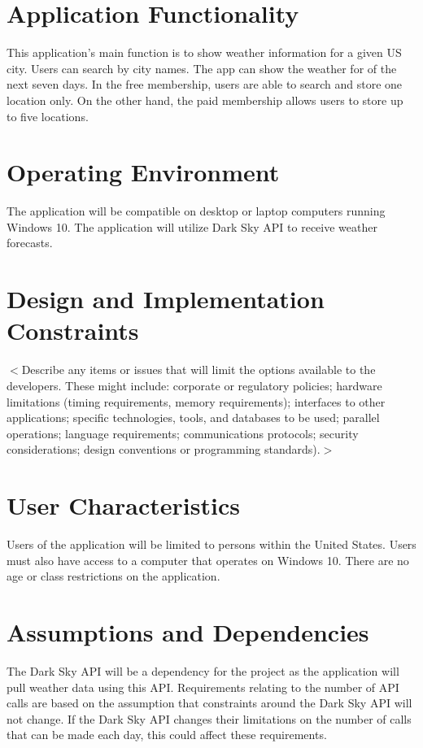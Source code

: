 \documentclass{scrreprt}
\begin{document}
\section{Application Functionality}
This application's main function is to show weather information for a given US city. Users can search by city names. The app can show the weather for of the next seven days. In the free membership, users are able to search and store one location only. On the other hand, the paid membership allows users to store up to five locations. 	

\section{Operating Environment}
The application will be compatible on desktop or laptop computers running Windows 10. The application will utilize Dark Sky API to receive weather forecasts.	

\section{Design and Implementation Constraints}
$<$Describe any items or issues that will limit the options available to the 
developers. These might include: corporate or regulatory policies; hardware 
limitations (timing requirements, memory requirements); interfaces to other 
applications; specific technologies, tools, and databases to be used; parallel 
operations; language requirements; communications protocols; security 
considerations; design conventions or programming standards).$>$

\section{User Characteristics}
Users of the application will be limited to persons within the United States. Users must also have access to a computer that operates on Windows 10. There are no age or class restrictions on the application.
					
\section{Assumptions and Dependencies}
The Dark Sky API will be a dependency for the project as the application will pull weather data using this API. Requirements relating to the number of API calls are based on the assumption that constraints around the Dark Sky API will not change. If the Dark Sky API changes their limitations on the number of calls that can be made each day, this could affect these requirements. 		
\end{document}
